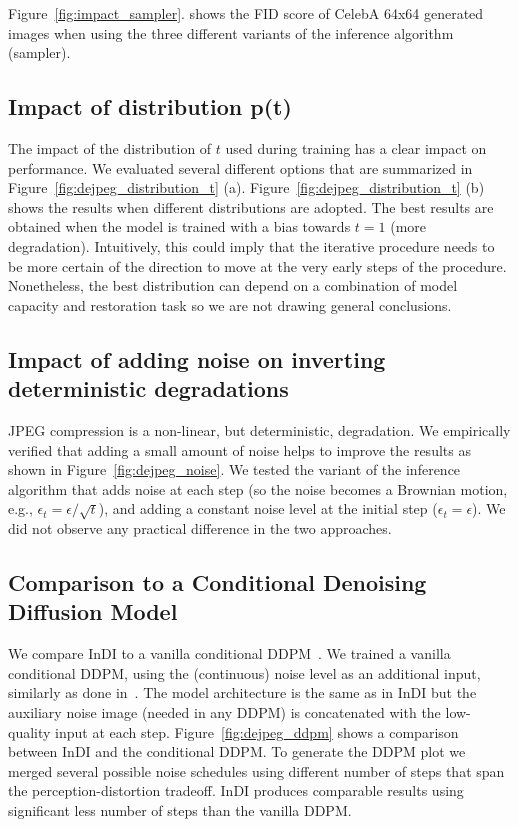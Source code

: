 \documentclass[10pt]{article} %
\begin{document}
 Figure~\ref{fig:impact_sampler}. shows the FID score of CelebA 64x64 generated images when using the three different variants of the inference algorithm (sampler).
 
\subsection{Impact of distribution p(t)} 

\label{sec:impact_pt}

The impact of the distribution of $t$ used during training has a clear impact on performance. We evaluated several different options that are summarized in Figure~\ref{fig:dejpeg_distribution_t} (a).  Figure~\ref{fig:dejpeg_distribution_t} (b) shows the results when different distributions are adopted. 
The best results are obtained when the model is trained with a bias towards $t=1$ (more degradation). Intuitively, this could imply that the iterative procedure needs to be more certain of the direction to move at the very early steps of the procedure. Nonetheless, the best distribution can depend on a combination of model capacity and restoration task so we are not drawing general conclusions.

\subsection{Impact of adding noise on inverting deterministic degradations}
\label{sec:experiment_noise_jpeg}

JPEG compression is a non-linear, but deterministic, degradation. We empirically verified that adding a small amount of noise helps to improve the results as shown in Figure~\ref{fig:dejpeg_noise}. We tested the variant of the inference algorithm that adds noise at each step (so the noise becomes a Brownian motion, e.g., $\epsilon_t=\epsilon / \sqrt{t}$), and adding a constant noise level at the initial step ($\epsilon_t = \epsilon$). We did not observe any practical difference in the two approaches.

\subsection{Comparison to a Conditional Denoising Diffusion Model}
\label{sec:comparison_ddpm}

We compare InDI to a vanilla conditional DDPM~\citep{ho2020denoising}. We trained a vanilla conditional DDPM, using the (continuous) noise level as an additional input, similarly as done in~\citet{saharia2021image,whang2022deblurring}. The model architecture is the same as in InDI but the auxiliary noise image (needed in any DDPM) is concatenated with the low-quality input at each step. Figure~\ref{fig:dejpeg_ddpm} shows a comparison between InDI and the conditional DDPM. To generate the DDPM plot we merged several possible noise schedules using different number of steps that span the perception-distortion tradeoff. InDI produces comparable results using significant less number of steps than the vanilla DDPM. 
\end{document}

